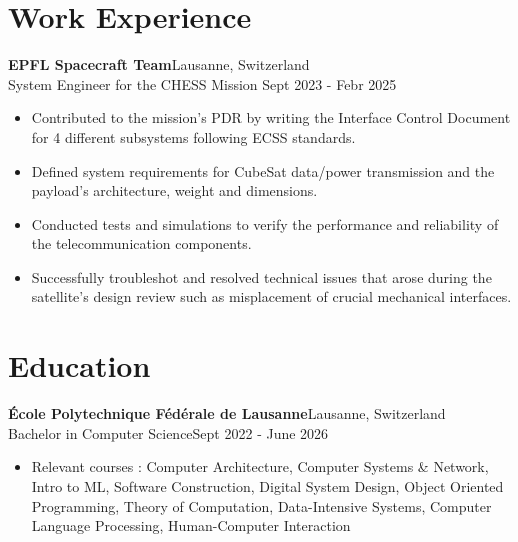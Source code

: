 \documentclass[a4paper, 10pt]{article}
\newenvironment{highlights}{
    \begin{itemize}[
        topsep=0.10 cm,
        parsep=0.10 cm,
        partopsep=0pt,
        itemsep=0pt,
        leftmargin=0.4 cm + 10pt
    ]
}{
    \end{itemize}
} %
\let\hrefWithoutArrow\href
\renewcommand{\href}[2]{\hrefWithoutArrow{#1}{\ifthenelse{\equal{#2}{}}{ }{#2 }\raisebox{.15ex}{\footnotesize \faExternalLink*}}}
\begin{document}
    \section{Work Experience}
        \textbf{EPFL Spacecraft Team}\href{https://www.epflspacecraftteam.ch/}{}\hfill Lausanne, Switzerland\\
        {System Engineer for the CHESS Mission} \hfill Sept 2023 - Febr 2025
        \begin{highlights}
            \item Contributed to the mission's PDR by writing the Interface Control Document for 4 different subsystems following ECSS standards.
            \item Defined system requirements for CubeSat data/power transmission and the payload’s architecture, weight and dimensions.
            \item Conducted tests and simulations to verify the performance and reliability of the telecommunication components.
            \item Successfully troubleshot and resolved technical issues that arose during the satellite's design review such as misplacement of crucial mechanical interfaces.
        \end{highlights}
        
    \section{Education}
        \textbf{École Polytechnique Fédérale de Lausanne}\hfill Lausanne, Switzerland\\
        Bachelor in Computer Science\hfill Sept 2022 - June 2026
        \begin{highlights}
            \item Relevant courses : Computer Architecture, Computer Systems \& Network, Intro to ML, Software Construction, Digital System Design, Object Oriented Programming, 
                Theory of Computation, Data-Intensive Systems, Computer Language Processing, Human-Computer Interaction 
            
        \end{highlights}
            
\end{document}

